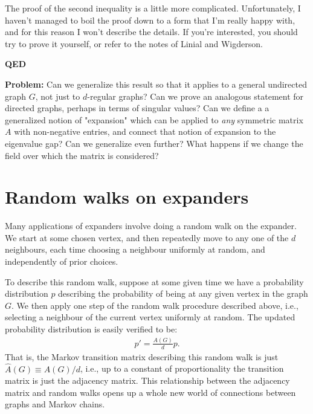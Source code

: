 \documentclass[12pt]{article}
\begin{document}
The proof of the second inequality is a little more complicated.
Unfortunately, I haven't managed to boil the proof down to a form that
I'm really happy with, and for this reason I won't describe the
details.  If you're interested, you should try to prove it yourself,
or refer to the notes of Linial and Wigderson.

\textbf{QED}

\textbf{Problem:} Can we generalize this result so that it applies to
a general undirected graph $G$, not just to $d$-regular graphs?  Can
we prove an analogous statement for directed graphs, perhaps in terms
of singular values?  Can we define a a generalized notion of
"expansion" which can be applied to \emph{any} symmetric matrix $A$
with non-negative entries, and connect that notion of expansion to the
eigenvalue gap?  Can we generalize even further?  What happens if we
change the field over which the matrix is considered?



\section{Random walks on expanders}

Many applications of expanders involve doing a random walk on the
expander.  We start at some chosen vertex, and then repeatedly move to
any one of the $d$ neighbours, each time choosing a neighbour
uniformly at random, and independently of prior choices.

To describe this random walk, suppose at some given time we have a
probability distribution $p$ describing the probability of being at
any given vertex in the graph $G$.  We then apply one step of the
random walk procedure described above, i.e., selecting a neighbour of
the current vertex uniformly at random.  The updated probability
distribution is easily verified to be:
\begin{eqnarray}
  p' = \frac{A(G)}{d} p.
\end{eqnarray}
That is, the Markov transition matrix describing this random walk is
just $\hat A(G) \equiv A(G)/d$, i.e., up to a constant of
proportionality the transition matrix is just the adjacency matrix.
This relationship between the adjacency matrix and random walks opens
up a whole new world of connections between graphs and Markov chains.
\end{document}

